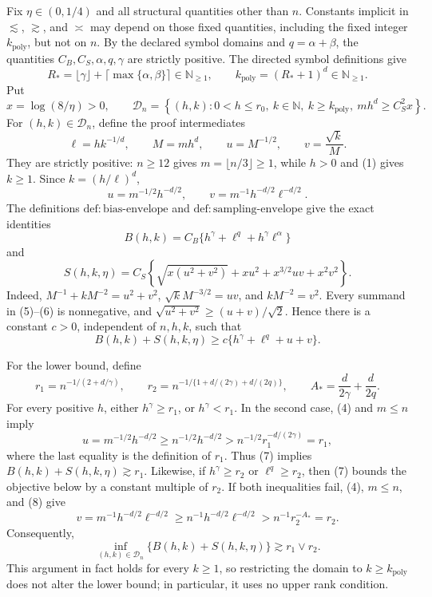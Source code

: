 Fix \(\eta\in(0,1/4)\) and all structural quantities other than \(n\).  Constants implicit in \(\lesssim\), \(\gtrsim\), and \(\asymp\) may depend on those fixed quantities, including the fixed integer \(k_{\mathrm{poly}}\), but not on \(n\).  By the declared symbol domains and \(q=\alpha+\beta\), the quantities \(C_B,C_S,\alpha,q,\gamma\) are strictly positive.  The directed symbol definitions give
\[
 R_*=\lfloor\gamma\rfloor+\lceil\max\{\alpha,\beta\}\rceil\in\mathbb N_{\ge1},
 \qquad
 k_{\mathrm{poly}}=(R_*+1)^d\in\mathbb N_{\ge1}.
 \tag{1}
\]
Put
\[
 x=\log(8/\eta)>0,
 \qquad
 \mathcal D_n=\left\{(h,k):0<h\le r_0,\ k\in\mathbb N,\ k\ge k_{\mathrm{poly}},\ m h^d\ge C_S^2x\right\}.
 \tag{2}
\]
For \((h,k)\in\mathcal D_n\), define the proof intermediates
\[
 \ell=h k^{-1/d},\qquad M=m h^d,\qquad
 u=M^{-1/2},\qquad v=\frac{\sqrt{k}}{M}.
 \tag{3}
\]
They are strictly positive: \(n\ge12\) gives \(m=\lfloor n/3\rfloor\ge1\), while \(h>0\) and (1) gives \(k\ge1\).  Since \(k=(h/\ell)^d\),
\[
 u=m^{-1/2}h^{-d/2},
 \qquad
 v=m^{-1}h^{-d/2}\ell^{-d/2}.
 \tag{4}
\]
The definitions \(\mathrm{def{:}bias\text{-}envelope}\) and \(\mathrm{def{:}sampling\text{-}envelope}\) give the exact identities
\[
 B(h,k)=C_B\{h^\gamma+\ell^q+h^\gamma\ell^\alpha\}
 \tag{5}
\]
and
\[
 S(h,k,\eta)=C_S\left\{
 \sqrt{x(u^2+v^2)}+x u^2+x^{3/2}uv+x^2v^2
 \right\}.
 \tag{6}
\]
Indeed, \(M^{-1}+kM^{-2}=u^2+v^2\), \(\sqrt{k}M^{-3/2}=uv\), and \(kM^{-2}=v^2\).  Every summand in (5)--(6) is nonnegative, and \(\sqrt{u^2+v^2}\ge(u+v)/\sqrt2\).  Hence there is a constant \(c>0\), independent of \(n,h,k\), such that
\[
 B(h,k)+S(h,k,\eta)
 \ge c\{h^\gamma+\ell^q+u+v\}.
 \tag{7}
\]

For the lower bound, define
\[
 r_1=n^{-1/(2+d/\gamma)},
 \qquad
 r_2=n^{-1/\{1+d/(2\gamma)+d/(2q)\}},
 \qquad
 A_* = \frac d{2\gamma}+\frac d{2q}.
 \tag{8}
\]
For every positive \(h\), either \(h^\gamma\ge r_1\), or \(h^\gamma<r_1\).  In the second case, (4) and \(m\le n\) imply
\[
 u=m^{-1/2}h^{-d/2}
 \ge n^{-1/2}h^{-d/2}
 >n^{-1/2}r_1^{-d/(2\gamma)}=r_1,
 \tag{9}
\]
where the last equality is the definition of \(r_1\).  Thus (7) implies \(B(h,k)+S(h,k,\eta)\gtrsim r_1\).  Likewise, if \(h^\gamma\ge r_2\) or \(\ell^q\ge r_2\), then (7) bounds the objective below by a constant multiple of \(r_2\).  If both inequalities fail, (4), \(m\le n\), and (8) give
\[
 v=m^{-1}h^{-d/2}\ell^{-d/2}
 \ge n^{-1}h^{-d/2}\ell^{-d/2}
 >n^{-1}r_2^{-A_*}=r_2.
 \tag{10}
\]
Consequently,
\[
 \inf_{(h,k)\in\mathcal D_n}\{B(h,k)+S(h,k,\eta)\}
 \gtrsim r_1\vee r_2.
 \tag{11}
\]
This argument in fact holds for every \(k\ge1\), so restricting the domain to \(k\ge k_{\mathrm{poly}}\) does not alter the lower bound; in particular, it uses no upper rank condition.


